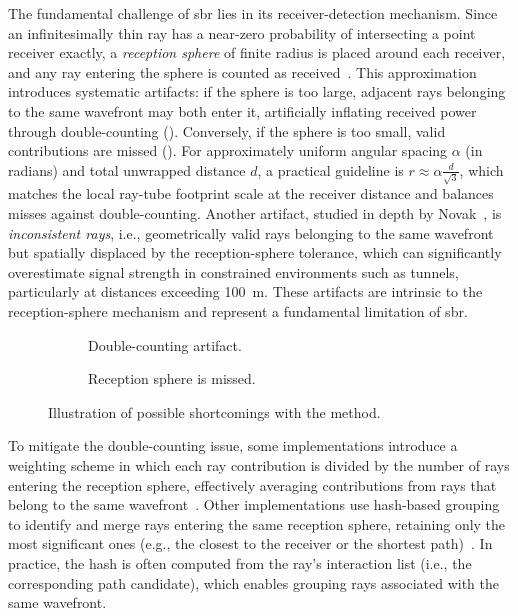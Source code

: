The fundamental challenge of \gls{sbr} lies in its receiver-detection mechanism. Since an infinitesimally thin ray has a near-zero probability of intersecting a point receiver exactly, a \emph{reception sphere} of finite radius is placed around each receiver, and any ray entering the sphere is counted as received~. This approximation introduces systematic artifacts: if the sphere is too large, adjacent rays belonging to the same wavefront may both enter it, artificially inflating received power through double-counting (). Conversely, if the sphere is too small, valid contributions are missed (). For approximately uniform angular spacing $\alpha$ (in radians) and total unwrapped distance $d$, a practical guideline is $r\approx\alpha \tfrac{d}{\sqrt{3}}$, which matches the local ray-tube footprint scale at the receiver distance and balances misses against double-counting. Another artifact, studied in depth by Novak~, is \emph{inconsistent rays}, i.e., geometrically valid rays belonging to the same wavefront but spatially displaced by the reception-sphere tolerance, which can significantly overestimate signal strength in constrained environments such as tunnels, particularly at distances exceeding \qty{100}{\meter}. These artifacts are intrinsic to the reception-sphere mechanism and represent a fundamental limitation of \gls{sbr}.

\begin{figure}
  \centering
  \begin{subfigure}[b]{0.49\contentwidth}
    \centering
    \caption{Double-counting artifact.}
  \end{subfigure}
  \begin{subfigure}[b]{0.49\contentwidth}
    \centering
    \caption{Reception sphere is missed.}
  \end{subfigure}
  \caption{Illustration of possible shortcomings with the  method.}
\end{figure}

To mitigate the double-counting issue, some implementations introduce a weighting scheme in which each ray contribution is divided by the number of rays entering the reception sphere, effectively averaging contributions from rays that belong to the same wavefront~. Other implementations use hash-based grouping to identify and merge rays entering the same reception sphere, retaining only the most significant ones (e.g., the closest to the receiver or the shortest path)~. In practice, the hash is often computed from the ray's interaction list (i.e., the corresponding path candidate), which enables grouping rays associated with the same wavefront.

